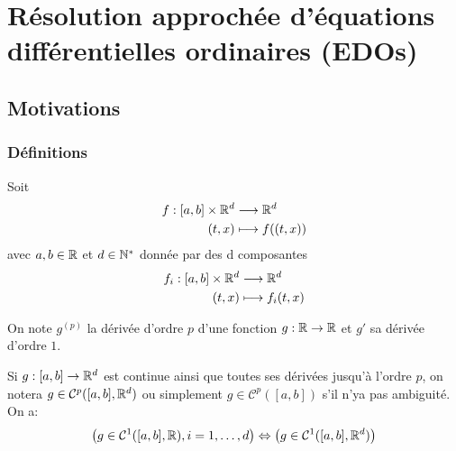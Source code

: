 \chapter{Résolution approchée d'équations différentielles ordinaires (EDOs)}
\section{Motivations}
\subsection{Définitions}
\begin{definition}
    Soit \begin{align*}
        f: [a, b] \times \mathbb{R}^d&\longrightarrow \mathbb{R}^d \\
        (t, x) &\longmapsto f((t, x))
    \end{align*} 
    avec $a,b \in \mathbb{R}$ et $d \in \mathbb{N}^*$ donnée par des d composantes
    \begin{align*}
        f_i: [a, b] \times \mathbb{R}^d&\longrightarrow \mathbb{R}^d \\
        (t, x) &\longmapsto f_i(t, x)
    \end{align*}
\end{definition}
On note $g^{(p)}$ la dérivée d'ordre  $p$ d'une fonction  $g: \mathbb{R} \to \mathbb{R}$ et $g'$ sa dérivée d'ordre  $1$. 

Si $g: [a, b] \to \mathbb{R}^d$ est continue ainsi que toutes ses dérivées jusqu'à l'ordre $p$, on notera  $g \in \mathcal{C}^p([a, b], \mathbb{R}^d)$ ou simplement $g \in \mathcal{C}^p([a, b])$ s'il n'ya pas ambiguité. On a:
 \[
     \left( g \in \mathcal{C}^{1}([a, b], \mathbb{R}), i = 1, \ldots, d \right) \Leftrightarrow \left( g \in \mathcal{C}^{1}([a,b], \mathbb{R}^d) \right) 
\] 

